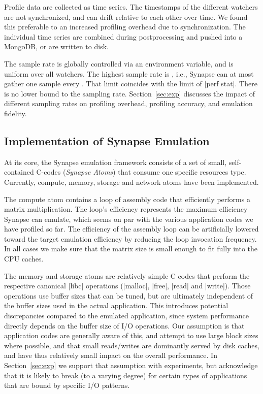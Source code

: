 \documentclass[10pt, conference, compsocconf]{IEEEtran}
\newcommand{\I}[1]{\textit{#1}\xspace}
\newcommand{\synapse}{Synapse\xspace}
\newcommand{\Synapse}{Synapse\xspace}
\begin{document}
 Profile data are collected as time series.  The timestamps of the
 different watchers are not synchronized, and can drift relative to
 each other over time.  We found this preferable to an increased
 profiling overhead due to synchronization.  The individual time
 series are combined during postprocessing and pushed into a MongoDB,
 or are written to disk.

 The sample rate is globally controlled via an environment variable,
 and is uniform over all watchers.  The highest sample rate is ,
 i.e., \synapse can at most gather one sample every .  That limit
 coincides with the limit of |perf stat|.  There is no lower bound to
 the sampling rate.  Section~\ref{sec:exp} discusses the impact of
 different sampling rates on profiling overhead, profiling accuracy,
 and emulation fidelity.


 \subsection{Implementation of \Synapse Emulation}

 At its core, the \synapse emulation framework consists of a set of
 small, self-contained C-codes (\I{\synapse Atoms}) that consume one
 specific resources type.  Currently, compute, memory, storage and
 network atoms have been implemented.

 The compute atom contains a loop of assembly code that efficiently
 performs a matrix multiplication.  The loop's efficiency represents
 the maximum efficiency \synapse can emulate, which seems on par with
 the various application codes we have profiled so far.  The
 efficiency of the assembly loop can be artificially lowered toward
 the target emulation efficiency by reducing the loop invocation
 frequency.  In all cases we make sure that the matrix size is small
 enough to fit fully into the CPU caches.

 The memory and storage atoms are relatively simple C codes that
 perform the respective canonical |libc| operations (|malloc|, |free|,
 |read| and |write|).  Those operations use buffer sizes that can be
 tuned, but are ultimately independent of the buffer sizes used in the
 actual application.  This introduces potential discrepancies compared
 to the emulated application, since system performance directly
 depends on the buffer size of I/O operations.  Our assumption is that
 application codes are generally aware of this, and attempt to use
 large block sizes where possible, and that small reads/writes are
 dominantly served by disk caches, and have thus
 relatively small impact on the overall performance.  In
 Section~\ref{sec:exp} we support that assumption with experiments,
 but acknowledge that it is likely to break (to a varying degree) for
 certain types of applications that are bound by specific I/O
 patterns.
 
\end{document}
